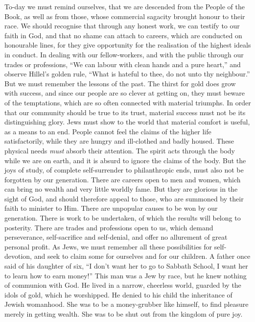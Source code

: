 To-day we must remind ourselves, that
we are descended from the People of the
Book, as well as from those, whose
commercial sagacity brought honour to their
race. We should recognise that through any
honest work, we can testify to our faith in God,
and that no shame can attach to careers, which
are conducted on honourable lines, for they
give opportunity for the realisation of the
highest ideals in conduct. In dealing with
our fellow-workers, and with the public
through our trades or professions, “We can
labour with clean hands and a pure heart,”
and observe Hillel’s golden rule, “What is
hateful to thee, do not unto thy neighbour.”
But we must remember the lessons of the
past. The thirst for gold does grow with
success, and since our people are so clever
at getting on, they must beware of the
temptations, which are so often connected
with material triumphs. In order that our
community should be true to its trust,
material success must not be its distinguishing
glory. Jews must show to the world
that material comfort is useful, as a means
to an end. People cannot feel the claims of
the higher life satisfactorily, while they are
hungry and ill-clothed and badly housed.
These physical needs \textsl{must} absorb their
attention. The spirit acts through the body
while we are on earth, and it is absurd to
ignore the claims of the body. But the
joys of study, of complete self-surrender to
philanthropic ends, must also not be forgotten
by our generation. There are careers
open to men and women, which can bring
no wealth and very little worldly fame. But
they are glorious in the sight of God, and
should therefore appeal to those, who are
summoned by their faith to minister to Him.
There are unpopular causes to be won by
our generation. There is work to be undertaken,
of which the results will belong to
posterity. There are trades and professions
open to us, which demand perseverance,
self-sacrifice and self-denial, and offer no
allurement of great personal profit. As Jews, we
must remember all these possibilities for
self-devotion, and seek to claim some for
ourselves and for our children. A father
once said of his daughter of six, “I don’t
want her to go to Sabbath School, I want
her to learn how to earn money!” This
man was a Jew by race, but he knew
nothing of communion with God. He
lived in a narrow, cheerless world, guarded
by the idols of gold, which he worshipped.
He denied to his child the inheritance of
Jewish womanhood. She was to be a
money-grubber like himself, to find pleasure
merely in getting wealth. She was to be
shut out from the kingdom of pure joy.


